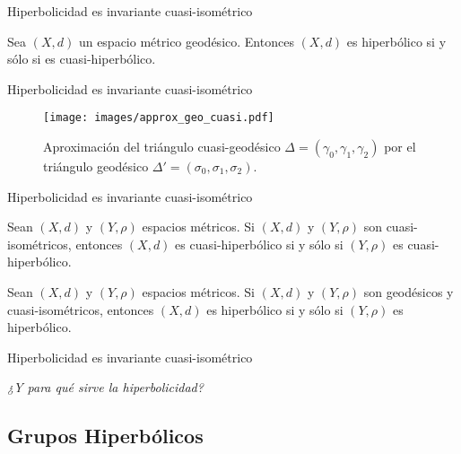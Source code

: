 \documentclass[xcolor=dvipsnames,aspectratio=159]{beamer}
\theoremstyle{largebreak}
\begin{document}
\begin{frame}{Hiperbolicidad es invariante cuasi-isométrico}
    \begin{theor}
        Sea $(X,d)$ un espacio métrico geodésico. Entonces $(X,d)$ es hiperbólico si y sólo si es cuasi-hiperbólico.
    \end{theor}
\end{frame}

\begin{frame}{Hiperbolicidad es invariante cuasi-isométrico}
    \begin{figure}
        \begin{center}
            \texttt{[image: images/approx\_geo\_cuasi.pdf]}
        \end{center}
        \caption{Aproximación del triángulo cuasi-geodésico $\Delta=(\gamma_0,\gamma_1,\gamma_2)$ por el triángulo geodésico $\Delta'=(\sigma_0,\sigma_1,\sigma_2)$.}
    \end{figure}
\end{frame}

\begin{frame}{Hiperbolicidad es invariante cuasi-isométrico}
    \begin{theor}
        Sean $(X,d)$ y $(Y,\rho)$ espacios métricos. Si $(X,d)$ y $(Y,\rho)$ son cuasi-isométricos, entonces $(X,d)$ es cuasi-hiperbólico si y sólo si $(Y,\rho)$ es cuasi-hiperbólico. 
    \end{theor}

    \pause

    \begin{cor}
        Sean $(X,d)$ y $(Y,\rho)$ espacios métricos. Si $(X,d)$ y $(Y,\rho)$ son geodésicos y cuasi-isométricos, entonces $(X,d)$ es hiperbólico si y sólo si $(Y,\rho)$ es hiperbólico. 
    \end{cor}
\end{frame}

\begin{frame}{Hiperbolicidad es invariante cuasi-isométrico}
    \begin{center}
        \Large\textit{¿Y para qué sirve la hiperbolicidad?}
    \end{center}
\end{frame}

\subsection{Grupos Hiperbólicos}
\end{document}
